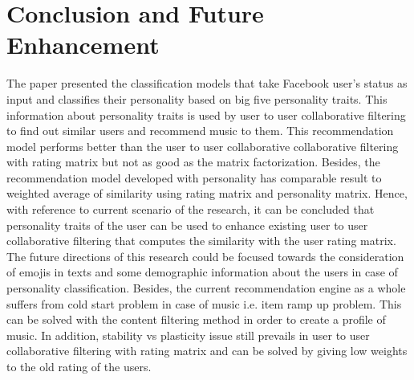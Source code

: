 \documentclass[conference]{IEEEtran}
\begin{document}
\section{Conclusion and Future Enhancement}
The paper presented the classification models that take Facebook user's status as input and classifies their personality based on big five personality traits. This information about personality traits is used by user to user collaborative filtering to find out similar users and recommend music to them. This recommendation model performs better than the user to user collaborative collaborative filtering with rating matrix but not as good as the matrix factorization. Besides, the recommendation model developed with personality has comparable result to weighted average of similarity using rating matrix and personality matrix. Hence, with reference to current scenario of the research, it can be concluded that personality traits of the user can be used to enhance existing user to user collaborative filtering that computes the similarity with the user rating matrix.
The future directions of this research could be focused towards the consideration of emojis in texts and some demographic information about the users in case of personality classification. Besides, the current recommendation engine as a whole suffers from cold start problem in case of music i.e. item ramp up problem. This can be solved with the content filtering method in order to create a profile of music. In addition, stability vs plasticity issue still prevails in user to user collaborative filtering with rating matrix and can be solved by giving low weights to the old rating of the users.

 



%
%
\end{document}
